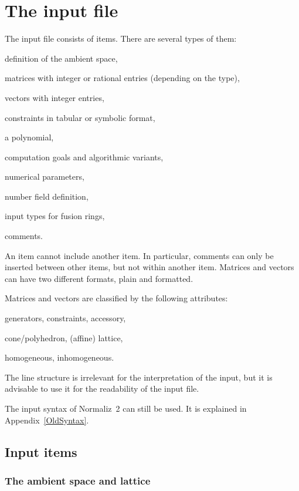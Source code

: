 \section{The input file}\label{input}

The input file  consists of items. There are several types of them:

\begin{arab}
	\item definition of the ambient space,
	\item matrices with integer or rational entries (depending on the type),
	\item vectors with integer entries,
	\item constraints in tabular or symbolic format,
	\item a polynomial,
	\item computation goals and algorithmic variants,
	\item numerical parameters,
	\item number field definition,
	\item input types for fusion rings,
	\item comments.
\end{arab}

An item cannot include another item. In particular, comments can only be inserted between other items, but not within another item. Matrices and vectors can have two different formats, plain and formatted.

Matrices and vectors are classified by the following attributes:
\begin{arab}
	\item generators, constraints, accessory,
	\item cone/polyhedron, (affine) lattice,
	\item homogeneous, inhomogeneous.
\end{arab}

The line structure is irrelevant for the interpretation of the input, but it is advisable to use it for the readability of the input file.

The input syntax of Normaliz~2 can still be used. It is explained in Appendix~\ref{OldSyntax}.

\subsection{Input items}

\subsubsection{The ambient space and lattice}

